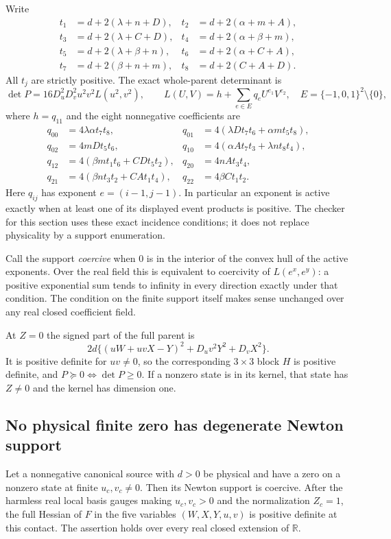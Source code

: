 Write
\begin{align*}
t_1&=d+2(\lambda+n+D),&t_2&=d+2(\alpha+m+A),\\
t_3&=d+2(\lambda+C+D),&t_4&=d+2(\alpha+\beta+m),\\
t_5&=d+2(\lambda+\beta+n),&t_6&=d+2(\alpha+C+A),\\
t_7&=d+2(\beta+n+m),&t_8&=d+2(C+A+D).
\end{align*}
All $t_j$ are strictly positive.  The exact whole-parent determinant is
\[
\det P=16D_u^2D_v^2u^2v^2L(u^2,v^2),\qquad
L(U,V)=h+\sum_{e\in E}q_eU^{e_1}V^{e_2},
\quad E=\{-1,0,1\}^2\setminus\{0\},
\tag{SE1}
\]
where $h=q_{11}$ and the eight nonnegative coefficients are
\begin{align*}
q_{00}&=4\lambda\alpha t_7t_8,&
q_{01}&=4(\lambda Dt_7t_6+\alpha mt_5t_8),\\
q_{02}&=4mDt_5t_6,&
q_{10}&=4(\alpha At_7t_3+\lambda nt_8t_4),\\
q_{12}&=4(\beta mt_1t_6+CDt_5t_2),&
q_{20}&=4nAt_3t_4,\\
q_{21}&=4(\beta nt_3t_2+CAt_1t_4),&
q_{22}&=4\beta Ct_1t_2.
\end{align*}
Here $q_{ij}$ has exponent $e=(i-1,j-1)$.  In particular an exponent
is active exactly when at least one of its displayed event products is
positive.  The checker for this section uses these exact incidence
conditions; it does not replace physicality by a support enumeration.

Call the support \emph{coercive} when $0$ is in the interior of the
convex hull of the active exponents.  Over the real field this is
equivalent to coercivity of $L(e^x,e^y)$: a positive exponential
sum tends to infinity in every direction exactly under that condition.
The condition on the finite support itself makes sense unchanged over
any real closed coefficient field.

At $Z=0$ the signed part of the full parent is
\[
2d\{(uW+uvX-Y)^2+D_uv^2Y^2+D_vX^2\}.
\tag{SE2}
\]
It is positive definite for $uv\ne0$, so the corresponding
$3\times3$ block $H$ is positive definite, and
$P\succeq0\Longleftrightarrow\det P\geq0$.  If a nonzero state is
in its kernel, that state has $Z\ne0$ and the kernel has dimension one.

\subsection{No physical finite zero has degenerate Newton support}

\begin{theorem}
Let a nonnegative canonical source with $d>0$ be physical and have a
zero on a nonzero state at finite $u_c,v_c\ne0$.  Then its Newton
support is coercive.  After the harmless real local basis gauges making
$u_c,v_c>0$ and the normalization $Z_c=1$, the full Hessian of $F$ in
the five variables $(W,X,Y,u,v)$ is positive definite at this contact.
The assertion holds over every real closed extension of $\mathbb R$.
\end{theorem}

